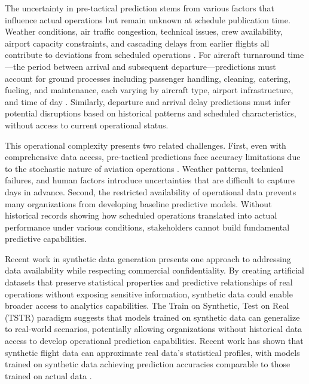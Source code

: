 \documentclass[conference]{IEEEtran}
\begin{document}
The uncertainty in pre-tactical prediction stems from various factors that influence actual operations but remain unknown at schedule publication time. Weather conditions, air traffic congestion, technical issues, crew availability, airport capacity constraints, and cascading delays from earlier flights all contribute to deviations from scheduled operations \cite{carvalho2021relevance}. For aircraft turnaround time—the period between arrival and subsequent departure—predictions must account for ground processes including passenger handling, cleaning, catering, fueling, and maintenance, each varying by aircraft type, airport infrastructure, and time of day \cite{de2023probabilistic}. Similarly, departure and arrival delay predictions must infer potential disruptions based on historical patterns and scheduled characteristics, without access to current operational status.

This operational complexity presents two related challenges. First, even with comprehensive data access, pre-tactical predictions face accuracy limitations due to the stochastic nature of aviation operations \cite{dalmau2024probabilistic}. Weather patterns, technical failures, and human factors introduce uncertainties that are difficult to capture days in advance. Second, the restricted availability of operational data prevents many organizations from developing baseline predictive models. Without historical records showing how scheduled operations translated into actual performance under various conditions, stakeholders cannot build fundamental predictive capabilities.



Recent work in synthetic data generation presents one approach to addressing data availability while respecting commercial confidentiality. By creating artificial datasets that preserve statistical properties and predictive relationships of real operations without exposing sensitive information, synthetic data could enable broader access to analytics capabilities. The Train on Synthetic, Test on Real (TSTR) paradigm \cite{esteban2017real} suggests that models trained on synthetic data can generalize to real-world scenarios, potentially allowing organizations without historical data access to develop operational prediction capabilities. Recent work has shown that synthetic flight data can approximate real data's statistical profiles, with models trained on synthetic data achieving prediction accuracies comparable to those trained on actual data \cite{aly2025synthetic}.
\end{document}
